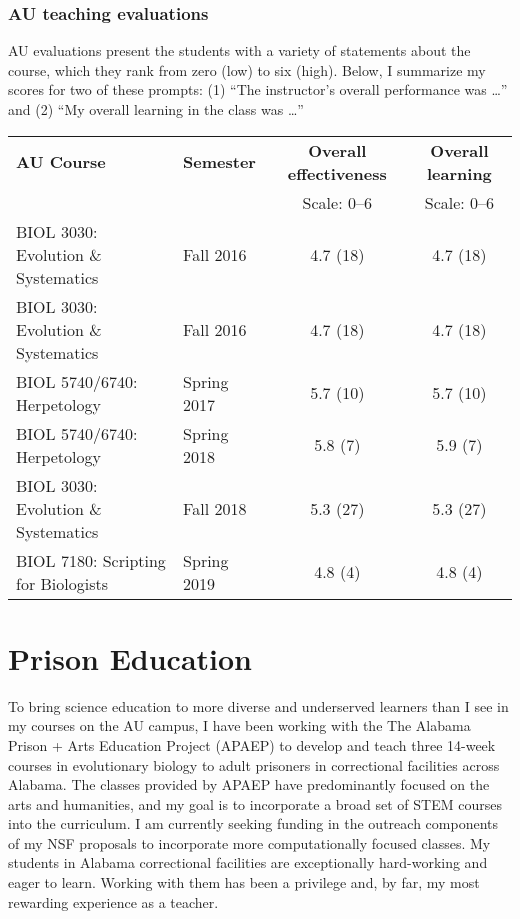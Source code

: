 \subsubsection*{AU teaching evaluations}
AU evaluations present the students with a variety of statements about the
course,
which they rank from zero (low) to six (high).
Below, I summarize my scores for two of these prompts:
(1) ``The instructor's overall performance was \ldots''
and
(2) ``My overall learning in the class was \ldots''
\begin{center}
\begin{tabular}{l l c c}
    \hline
    \textbf{AU Course} & \textbf{Semester} & \textbf{Overall effectiveness} & \textbf{Overall learning} \\
                       &                   & Scale: 0--6                    & Scale: 0--6 \\
    \hline
    BIOL 3030: Evolution \& Systematics & Fall 2016 & 4.7 (18) & 4.7 (18) \\
    BIOL 3030: Evolution \& Systematics & Fall 2016 & 4.7 (18) & 4.7 (18) \\
    BIOL 5740/6740: Herpetology & Spring 2017 & 5.7 (10) & 5.7 (10) \\
    BIOL 5740/6740: Herpetology & Spring 2018 & 5.8 (7) & 5.9 (7) \\
    BIOL 3030: Evolution \& Systematics & Fall 2018 & 5.3 (27) & 5.3 (27) \\
    BIOL 7180: Scripting for Biologists & Spring 2019 & 4.8 (4) & 4.8 (4) \\
    \hline
\end{tabular}
\end{center}

\section*{Prison Education}
To bring science education to more diverse and underserved learners than
I see in my courses on the AU campus,
I have been working with the
The Alabama Prison + Arts Education Project (APAEP) to develop and teach three
14-week courses in evolutionary biology to adult prisoners in correctional
facilities across Alabama.
The classes provided by APAEP have predominantly focused on the
arts and humanities, and
my
goal is to incorporate a broad set of STEM courses into the
curriculum.
I am currently seeking funding in the outreach components of my
NSF proposals
to incorporate more computationally focused classes.
My students in Alabama correctional facilities are exceptionally hard-working
and eager to learn.
Working with them has been a privilege and, by far, my most rewarding
experience as a teacher.

